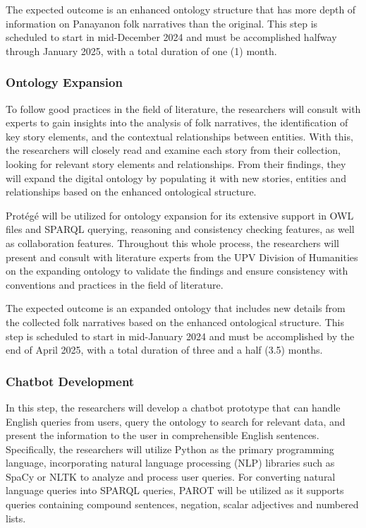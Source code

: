     The expected outcome is an enhanced ontology structure that has more depth of information on Panayanon folk narratives than the original. This step is scheduled to start in mid-December 2024 and must be accomplished halfway through January 2025, with a total duration of one (1) month.

\subsubsection{Ontology Expansion}

    To follow good practices in the field of literature, the researchers will consult with experts to gain insights into the analysis of folk narratives, the identification of key story elements, and the contextual relationships between entities. With this, the researchers will closely read and examine each story from their collection, looking for relevant story elements and relationships. From their findings, they will expand the digital ontology by populating it with new stories, entities and relationships based on the enhanced ontological structure. 
    
    Protégé will be utilized for ontology expansion for its extensive support in OWL files and SPARQL querying, reasoning and consistency checking features, as well as collaboration features. Throughout this whole process, the researchers will present and consult with literature experts from the UPV Division of Humanities on the expanding ontology to validate the findings and ensure consistency with conventions and practices in the field of literature.
    
    The expected outcome is an expanded ontology that includes new details from the collected folk narratives based on the enhanced ontological structure. This step is scheduled to start in mid-January 2024 and must be accomplished by the end of April 2025, with a total duration of three and a half (3.5) months.

\subsubsection{Chatbot Development}
    In this step, the researchers will develop a chatbot prototype that can handle English queries from users, query the ontology to search for relevant data, and present the information to the user in comprehensible English sentences. Specifically, the researchers will utilize Python as the primary programming language, incorporating natural language processing (NLP) libraries such as SpaCy or NLTK to analyze and process user queries. For converting natural language queries into SPARQL queries, PAROT \cite{ochieng2020parot} will be utilized as it supports queries containing compound sentences, negation, scalar adjectives and numbered lists.

